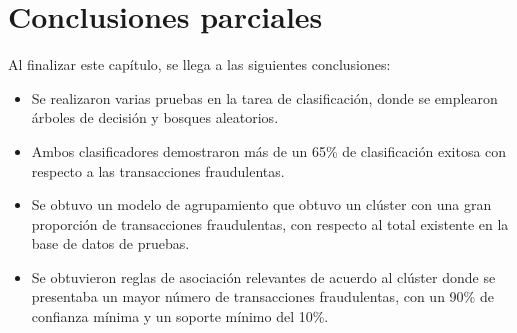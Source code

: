 \section{Conclusiones parciales}
Al finalizar este capítulo, se llega a las siguientes conclusiones:

\begin{itemize}
	\item Se realizaron varias pruebas en la tarea de clasificación, donde se emplearon árboles de decisión y bosques aleatorios.
	\item Ambos clasificadores demostraron más de un 65\% de clasificación exitosa con respecto a las transacciones fraudulentas.
	\item Se obtuvo un modelo de agrupamiento que obtuvo un clúster con una gran proporción de transacciones fraudulentas, con respecto al total existente en la base de datos de pruebas.
	\item Se obtuvieron reglas de asociación relevantes de acuerdo al clúster donde se presentaba un mayor número de transacciones fraudulentas, con un 90\% de confianza mínima y un soporte mínimo del 10\%.
\end{itemize}

\pagebreak
